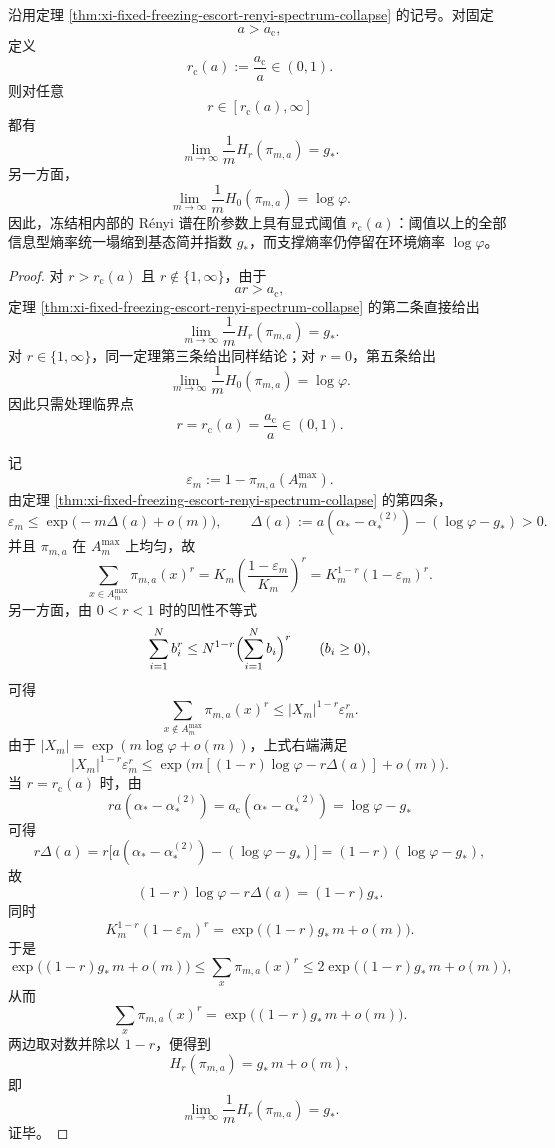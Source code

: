 \begin{corollary}\label{cor:xi-fixed-freezing-renyi-critical-order-threshold}
沿用定理 \ref{thm:xi-fixed-freezing-escort-renyi-spectrum-collapse} 的记号。对固定
\[
a>a_{\mathrm c},
\]
定义
\[
r_{\mathrm c}(a):=\frac{a_{\mathrm c}}{a}\in(0,1).
\]
则对任意
\[
r\in[r_{\mathrm c}(a),\infty]
\]
都有
\[
\lim_{m\to\infty}\frac1m H_r(\pi_{m,a})=g_*.
\]
另一方面，
\[
\lim_{m\to\infty}\frac1m H_0(\pi_{m,a})=\log\varphi.
\]
因此，冻结相内部的 Rényi 谱在阶参数上具有显式阈值 \(r_{\mathrm c}(a)\)：阈值以上的全部信息型熵率统一塌缩到基态简并指数 \(g_*\)，而支撑熵率仍停留在环境熵率 \(\log\varphi\)。
\end{corollary}
\begin{proof}
对 \(r>r_{\mathrm c}(a)\) 且 \(r\notin\{1,\infty\}\)，由于
\[
ar>a_{\mathrm c},
\]
定理 \ref{thm:xi-fixed-freezing-escort-renyi-spectrum-collapse} 的第二条直接给出
\[
\lim_{m\to\infty}\frac1m H_r(\pi_{m,a})=g_*.
\]
对 \(r\in\{1,\infty\}\)，同一定理第三条给出同样结论；对 \(r=0\)，第五条给出
\[
\lim_{m\to\infty}\frac1m H_0(\pi_{m,a})=\log\varphi.
\]
因此只需处理临界点
\[
r=r_{\mathrm c}(a)=\frac{a_{\mathrm c}}{a}\in(0,1).
\]

记
\[
\varepsilon_m:=1-\pi_{m,a}(A_m^{\max}).
\]
由定理 \ref{thm:xi-fixed-freezing-escort-renyi-spectrum-collapse} 的第四条，
\[
\varepsilon_m\le \exp\!\bigl(-m\Delta(a)+o(m)\bigr),
\qquad
\Delta(a):=a(\alpha_*-\alpha_*^{(2)})-(\log\varphi-g_*)>0.
\]
并且 \(\pi_{m,a}\) 在 \(A_m^{\max}\) 上均匀，故
\[
\sum_{x\in A_m^{\max}}\pi_{m,a}(x)^r
=
K_m\left(\frac{1-\varepsilon_m}{K_m}\right)^r
=
K_m^{1-r}(1-\varepsilon_m)^r.
\]
另一方面，由 \(0<r<1\) 时的凹性不等式
\[
\sum_{i=1}^{N}b_i^r\le N^{1-r}\Bigl(\sum_{i=1}^{N}b_i\Bigr)^r
\qquad (b_i\ge 0),
\]
可得
\[
\sum_{x\notin A_m^{\max}}\pi_{m,a}(x)^r
\le
|X_m|^{1-r}\varepsilon_m^r.
\]
由于 \(|X_m|=\exp(m\log\varphi+o(m))\)，上式右端满足
\[
|X_m|^{1-r}\varepsilon_m^r
\le
\exp\!\bigl(m[(1-r)\log\varphi-r\Delta(a)]+o(m)\bigr).
\]
当 \(r=r_{\mathrm c}(a)\) 时，由
\[
ra(\alpha_*-\alpha_*^{(2)})=a_{\mathrm c}(\alpha_*-\alpha_*^{(2)})=\log\varphi-g_*
\]
可得
\[
r\Delta(a)=r\bigl[a(\alpha_*-\alpha_*^{(2)})-(\log\varphi-g_*)\bigr]
=(1-r)(\log\varphi-g_*),
\]
故
\[
(1-r)\log\varphi-r\Delta(a)=(1-r)g_*.
\]
同时
\[
K_m^{1-r}(1-\varepsilon_m)^r
=
\exp\!\bigl((1-r)g_*\,m+o(m)\bigr).
\]
于是
\[
\exp\!\bigl((1-r)g_*\,m+o(m)\bigr)
\le
\sum_x\pi_{m,a}(x)^r
\le
2\exp\!\bigl((1-r)g_*\,m+o(m)\bigr),
\]
从而
\[
\sum_x\pi_{m,a}(x)^r
=
\exp\!\bigl((1-r)g_*\,m+o(m)\bigr).
\]
两边取对数并除以 \(1-r\)，便得到
\[
H_r(\pi_{m,a})=g_*\,m+o(m),
\]
即
\[
\lim_{m\to\infty}\frac1m H_r(\pi_{m,a})=g_*.
\]
证毕。
\end{proof}

